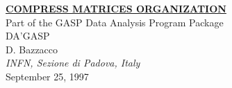 \textwidth15cm
\parindent1cm


\begin{center}
{\Large\bf\underline{COMPRESS MATRICES ORGANIZATION}} \\
\bigskip
Part of the GASP Data Analysis Program Package \\
\bigskip
\bigskip
{\huge DA'GASP}\\
\bigskip
\bigskip
{D. Bazzacco} \\
\bigskip
{\small\it INFN, Sezione di Padova, Italy}\\
\bigskip
September 25, 1997
\end{center}

\bigskip
\bigskip
\bigskip

\noindent

\bigskip




